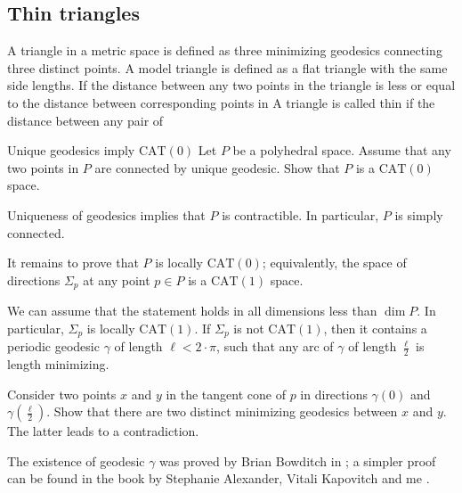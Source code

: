 




\subsection*{Thin triangles\easy}

A triangle in a metric space is defined as three minimizing  geodesics connecting three distinct points.
A model triangle is defined as a flat triangle with the same side lengths.
If the distance between any two points in the triangle is less or equal to the distance between corresponding points in 
A triangle is called thin if the distance between any pair of


\begin{pr}{\easy}{Unique geodesics imply $\mathrm{CAT}(0)$}\label{Unique geodesics imply CAT}
Let $P$ be a polyhedral space.
Assume that any two points in $P$ 
are connected by unique geodesic.
Show that $P$ is a $\mathrm{CAT}(0)$ space.
\end{pr}


Uniqueness of geodesics implies that $P$ is contractible.
In particular, $P$ is simply connected.

It remains to prove that $P$ is locally $\mathrm{CAT}(0)$;
equivalently, the space of directions $\Sigma_p$
at any point $p\in P$ is  a $\mathrm{CAT}(1)$ space.

We can assume that the statement holds in all dimensions less than $\dim P$. 
In particular, $\Sigma_p$ is locally $\mathrm{CAT}(1)$.
If $\Sigma_p$ is not $\mathrm{CAT}(1)$,
then it contains a periodic geodesic $\gamma$ of length $\ell<2\cdot\pi$,
such that any arc of $\gamma$ of length $\tfrac\ell2$ is length minimizing.

Consider two points $x$ and $y$
in the tangent cone of $p$
in directions $\gamma(0)$ and $\gamma(\tfrac\ell2)$.
Show that there are two distinct minimizing geodesics between $x$ and $y$.
The latter leads to a contradiction.
\qeds

The existence of geodesic $\gamma$ was proved by Brian Bowditch in \cite{bowditch};
a simpler proof can be found in the book 
by Stephanie Alexander, Vitali Kapovitch and me \cite[see][]{akp}.















